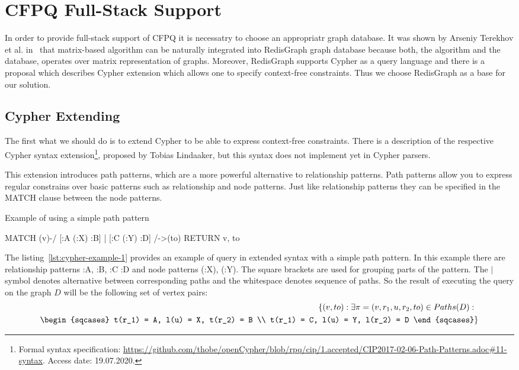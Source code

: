 \section{CFPQ Full-Stack Support}

In order to provide full-stack support of CFPQ it is necessatry to choose an appropriatr graph database.
It was shown by Arseniy Terekhov et al. in~\cite{10.1145/3398682.3399163} that matrix-based algorithm can be naturally integrated into RedisGraph graph database because both, the algorithm and the database, operates over matrix representation of graphs.
Moreover, RedisGraph supports Cypher as a query language and there is a proposal which describes Cypher extension which allows one to specify context-free constraints.
Thus we choose RedisGraph as a base for our solution.  


\subsection{Cypher Extending}

The first what we should do is to extend Cypher to be able to express context-free constraints.
There is a description of the respective Cypher syntax extension\footnote{\label{cypher-proposal}Formal syntax specification: \url{https://github.com/thobe/openCypher/blob/rpq/cip/1.accepted/CIP2017-02-06-Path-Patterns.adoc\#11-syntax}. Access date: 19.07.2020.}, proposed by Tobias Lindaaker, but this syntax does not implement yet in Cypher parsers.

This extension introduces path patterns, which are a more powerful alternative to relationship patterns. Path patterns allow you to express regular constrains over basic patterns such as relationship and node patterns. Just like relationship patterns they can be specified in the MATCH clause between the node patterns.

\begin{algorithm}
\begin{algorithmic}[1]
\caption{Example of using a simple path pattern}
\label{lst:cypher-example-1}
\State MATCH (v)-/ [:A (:X) :B] | [:C (:Y) :D] /->(to)
\State RETURN v, to
\end{algorithmic}
\end{algorithm}

The listing~\ref{lst:cypher-example-1} provides an example of query in extended syntax with a simple path pattern. In this example there are relationship patterns :A, :B, :C :D and node patterns (:X), (:Y). The square brackets are used for grouping parts of the pattern. The $|$ symbol denotes alternative between corresponding paths and the whitespace denotes sequence of paths. So the result of executing the query on the graph $D$ will be the following set of vertex pairs:
\begin{align*}
\{(v, to): \exists \pi = (v,r_1,u,r_2,to) \in Paths(D):& \\
\begin{sqcases}
    t(r_1) = A, l(u) = X, t(r_2) = B  \\
    t(r_1) = C, l(u) = Y, l(r_2) = D
\end{sqcases}&\}
\end{align*}


